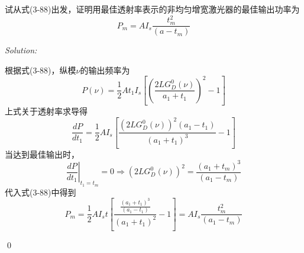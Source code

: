 \documentclass[12pt,a4paper]{article}
\newenvironment{problem}[2][Problem]{\begin{trivlist}
\item[\hskip \labelsep {\bfseries #1}\hskip \labelsep {\bfseries #2.}]}{\end{trivlist}}
\newenvironment{sol}
    {\emph{Solution:}
    }
    {
    \qed
    }
\begin{document}
\begin{problem}{3.11}
试从式(3-88)出发，证明用最佳透射率表示的非均匀增宽激光器的最佳输出功率为
\[
P_m=AI_s\frac{t_m^2}{(a-t_m)}
\]
\end{problem}
\begin{sol}
根据式(3-88)，纵模$\nu$的输出频率为
\begin{equation}
P(\nu)=\frac{1}{2}At_1I_s\left[\left(\frac{2LG_D^0(\nu)}{a_1+t_1}\right)^2-1\right]
\end{equation}
上式关于透射率求导得
\begin{equation}
\frac{dP}{dt_1}=\frac{1}{2}AI_s\left[\frac{(2LG_D^0(\nu))^2(a_1-t_1)}{(a_1+t_1)^3}-1\right]
\end{equation}
当达到最佳输出时，
\begin{equation}
\left.\frac{dP}{dt_1}\right|_{t_1=t_m}=0\Longrightarrow\left(2LG_D^0(\nu)\right)^2=\frac{(a_1+t_m)^3}{(a_1-t_m)}
\end{equation}
代入式(3-88)中得到
\begin{equation}
P_m=\frac{1}{2}AI_st\left[\frac{\frac{(a_1+t_1)^3}{(a_1-t_1)}}{(a_1+t_1)^2}-1\right]=AI_s\frac{t_m^2}{(a_1-t_m)}
\end{equation}
\end{sol}
\end{document}
